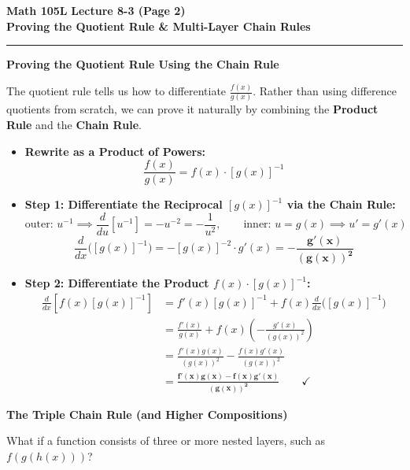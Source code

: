 \documentclass[10.5pt]{article}
\begin{document}
\newpage

\noindent \textbf{\large Math 105L} \hfill \textbf{\large Lecture 8-3 (Page 2)}\\[1pt]
{\textbf{\Large Proving the Quotient Rule \& Multi-Layer Chain Rules}}\\[-5pt]
\rule{\textwidth}{1.2pt}

\vspace{0.03in}

\textbf{\large Proving the Quotient Rule Using the Chain Rule}

The quotient rule tells us how to differentiate $\frac{f(x)}{g(x)}$. Rather than using difference quotients from scratch, we can prove it naturally by combining the \textbf{Product Rule} and the \textbf{Chain Rule}.

\begin{itemize}[leftmargin=1.2em, topsep=1pt, itemsep=2pt]
  \item \textbf{Rewrite as a Product of Powers:}
  \[
    \frac{f(x)}{g(x)} = f(x) \cdot [g(x)]^{-1}
  \]
  \item \textbf{Step 1: Differentiate the Reciprocal $[g(x)]^{-1}$ via the Chain Rule:}
  \[
    \text{outer: } u^{-1} \implies \frac{d}{du}[u^{-1}] = -u^{-2} = -\frac{1}{u^2}, \qquad \text{inner: } u = g(x) \implies u' = g'(x)
  \]
  \[
    \frac{d}{dx}\big([g(x)]^{-1}\big) = -[g(x)]^{-2} \cdot g'(x) = \mathbf{-\frac{g'(x)}{(g(x))^2}}
  \]
  \item \textbf{Step 2: Differentiate the Product $f(x) \cdot [g(x)]^{-1}$:}
  \begin{align*}
    \frac{d}{dx}\left[f(x)[g(x)]^{-1}\right] &= f'(x)[g(x)]^{-1} + f(x) \frac{d}{dx}\big([g(x)]^{-1}\big) \\
    &= \frac{f'(x)}{g(x)} + f(x)\left(-\frac{g'(x)}{(g(x))^2}\right) \\
    &= \frac{f'(x)g(x)}{(g(x))^2} - \frac{f(x)g'(x)}{(g(x))^2} \\
    &= \mathbf{\frac{f'(x)g(x) - f(x)g'(x)}{(g(x))^2}} \qquad \checkmark
  \end{align*}
\end{itemize}

\vspace{0.04in}

\textbf{\large The Triple Chain Rule (and Higher Compositions)}

What if a function consists of three or more nested layers, such as $f(g(h(x)))$?
\end{document}
